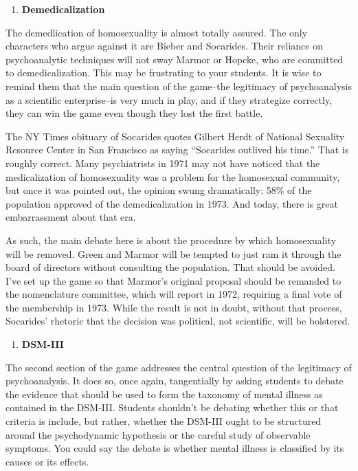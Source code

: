 \begin{refsection}
\begin{enumerate}
\item \textbf{Demedicalization}

\end{enumerate}

The demedlication of homosexuality is almost totally assured. The only characters who argue against it are Bieber and Socarides. Their reliance on psychoanalytic techniques will not sway Marmor or Hopcke, who are committed to demedicalization. This may be frustrating to your students. It is wise to remind them that the main question of the game--the legitimacy of psychoanalysis as a scientific enterprise--is very much in play, and if they strategize correctly, they can win the game even though they lost the first battle.

The NY Times obituary of Socarides quotes Gilbert Herdt of National Sexuality Resource Center in San Francisco as saying ``Socarides outlived his time.'' That is roughly correct. Many psychiatrists in 1971 may not have noticed that the medicalization of homosexuality was a problem for the homosexual community, but once it was pointed out, the opinion swung dramatically: 58\% of the population approved of the demedicalization in 1973. And today, there is great embarrassment about that era. 

As such, the main debate here is about the procedure by which homosexuality will be removed. Green and Marmor will be tempted to just ram it through the board of directors without consulting the population. That should be avoided. I've set up the game so that Marmor's original proposal should be remanded to the nomenclature committee, which will report in 1972, requiring a final vote of the membership in 1973. While the result is not in doubt, without that process, Socarides' rhetoric that the decision was political, not scientific, will be bolstered.

\begin{enumerate}
\item \textbf{DSM-III}

\end{enumerate}

The second section of the game addresses the central question of the legitimacy of psychoanalysis. It does so, once again, tangentially by asking students to debate the evidence that should be used to form the taxonomy of mental illness as contained in the DSM-III. Students shouldn't be debating whether this or that criteria is include, but rather, whether the DSM-III ought to be structured around the psychodynamic hypothesis or the careful study of observable symptoms. You could say the debate is whether mental illness is classified by its causes or its effects.


\end{refsection}
